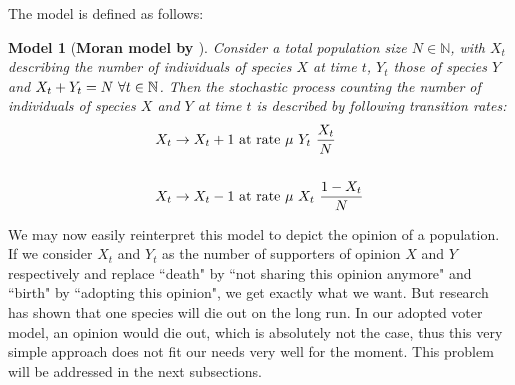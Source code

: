 \documentclass[12pt,a4paper,twoside]{article}
\newtheorem{model}{Model}[section]
\begin{document}
The model is defined as follows:
\begin{model}[\textbf{Moran model by \cite{Moran1958, Muller2015}}]\label{model:moran}
	Consider a total population size $N \in \mathbb{N}$, with $X_t$ describing the number of individuals of species $X$ at time $t$, $Y_t$ those of species $Y$ and $X_t + Y_t = N \textnormal{  }\forall t \in \mathbb{N}$. Then the stochastic process counting the number of individuals of species $X$ and $Y$ at time $t$ is described by following transition rates:
	\begin{align}
	\begin{split}
		X_t \rightarrow X_t + 1 &\textnormal{ at rate } \mu\textnormal{ }Y_t\textnormal{ }\frac{X_t}{N}\\
		&\\
		X_t \rightarrow X_t - 1 &\textnormal{ at rate } \mu\textnormal{ }X_t\textnormal{ }\frac{1 - X_t}{N}
	\end{split}
	\end{align}
\end{model}

We may now easily reinterpret this model to depict the opinion of a population. If we consider $X_t$ and $Y_t$ as the number of supporters of opinion $X$ and $Y$ respectively and replace ``death" by ``not sharing this opinion anymore" and ``birth" by ``adopting this opinion", we get exactly what we want. But research has shown that one species will die out on the long run. In our adopted voter model, an opinion would die out, which is absolutely not the case, thus this very simple approach does not fit our needs very well for the moment. This problem will be addressed in the next subsections.
\end{document}
